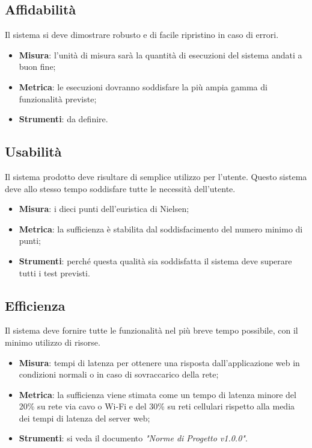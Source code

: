 \documentclass[12pt,a4paper,titlepage]{article}
\begin{document}
		\subsection{Affidabilità}
		Il sistema si deve dimostrare robusto e di facile ripristino in caso di errori.
		\begin{itemize}
			\item \textbf{Misura}: l'unità di misura sarà la quantità di esecuzioni del sistema andati a buon fine;
			\item \textbf{Metrica}: le esecuzioni dovranno soddisfare la più ampia gamma di funzionalità previste;
			\item \textbf{Strumenti}: da definire.
		\end{itemize}
	
		\subsection{Usabilità}
		Il sistema prodotto deve risultare di semplice utilizzo per l'utente. Questo sistema deve allo stesso tempo soddisfare tutte le necessità dell'utente.
		\begin{itemize}
			\item \textbf{Misura}: i dieci punti dell'euristica di Nielsen;
			\item \textbf{Metrica}: la sufficienza è stabilita dal soddisfacimento del numero minimo di punti;
			\item \textbf{Strumenti}: perché questa qualità sia soddisfatta il sistema deve superare tutti i test previsti.
		\end{itemize}
	
		\subsection{Efficienza}
		Il sistema deve fornire tutte le funzionalità nel più breve tempo possibile, con il minimo utilizzo di risorse.
		\begin{itemize}
			\item \textbf{Misura}: tempi di latenza per ottenere una risposta dall'applicazione web in condizioni normali o in caso di sovraccarico della rete;
			\item \textbf{Metrica}: la sufficienza viene stimata come un tempo di latenza minore del 20\% su rete via cavo o Wi-Fi e del 30\% su reti cellulari rispetto alla media dei tempi di latenza del server web;
			\item \textbf{Strumenti}: si veda il documento \textit{"Norme di Progetto v1.0.0"}.
		\end{itemize}
	
\end{document}
